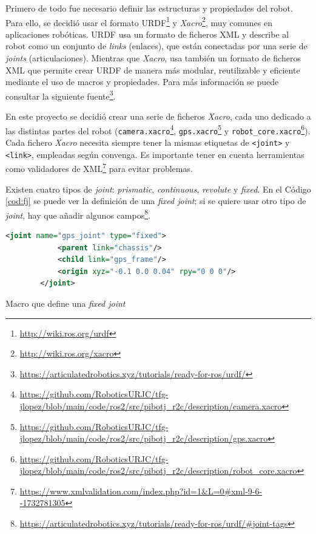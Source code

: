 Primero de todo fue necesario definir las estructuras y propiedades del robot. Para ello, se decidió usar el formato \ac{URDF}\footnote{\url{http://wiki.ros.org/urdf}} y \textit{Xacro}\footnote{\url{http://wiki.ros.org/xacro}}, muy comunes en aplicaciones robóticas. \acs{URDF} usa un formato de ficheros XML y describe al robot como un conjunto de \textit{links} (enlaces), que están conectadas por una serie de \textit{joints} (articulaciones). Mientras que \textit{Xacro}, usa también un formato de ficheros XML que permite crear URDF de manera más modular, reutilizable y eficiente mediante el uso de macros y propiedades. Para más información se puede consultar la siguiente fuente\footnote{\url{https://articulatedrobotics.xyz/tutorials/ready-for-ros/urdf/}}.

En este proyecto se decidió crear una serie de ficheros \textit{Xacro}, cada uno dedicado a las distintas partes del robot (\verb|camera.xacro|\footnote{\url{https://github.com/RoboticsURJC/tfg-jlopez/blob/main/code/ros2/src/pibotj_r2c/description/camera.xacro}}, \verb|gps.xacro|\footnote{\url{https://github.com/RoboticsURJC/tfg-jlopez/blob/main/code/ros2/src/pibotj_r2c/description/gps.xacro}} y \verb|robot_core.xacro|\footnote{\url{https://github.com/RoboticsURJC/tfg-jlopez/blob/main/code/ros2/src/pibotj_r2c/description/robot_core.xacro}}). Cada fichero \textit{Xacro} necesita siempre tener la mismas etiquetas de \verb|<joint>| y \verb|<link>|, empleadas según convenga. Es importante tener en cuenta herramientas como validadores de XML\footnote{\url{https://www.xmlvalidation.com/index.php?id=1&L=0\#xml-9-6--1732781305}} para evitar problemas.

Existen cuatro tipos de \textit{joint}: \textit{prismatic}, \textit{continuous}, \textit{revolute} y \textit{fixed}. En el Código \ref{cod:fj} se puede ver la definición de una \textit{fixed joint}; si se quiere usar otro tipo de \textit{joint}, hay que añadir algunos campos\footnote{\url{https://articulatedrobotics.xyz/tutorials/ready-for-ros/urdf/\#joint-tags}}.

\begin{code}[h]
	\begin{lstlisting}[language=xml]
		<joint name="gps_joint" type="fixed">
			<parent link="chassis"/>
			<child link="gps_frame"/>
			<origin xyz="-0.1 0.0 0.04" rpy="0 0 0"/>
		</joint>
	\end{lstlisting}
	\caption[Macro que define \textit{fixed joint}]{Macro que define una \textit{fixed joint}}
	\label{cod:fj}
			\end{code}

